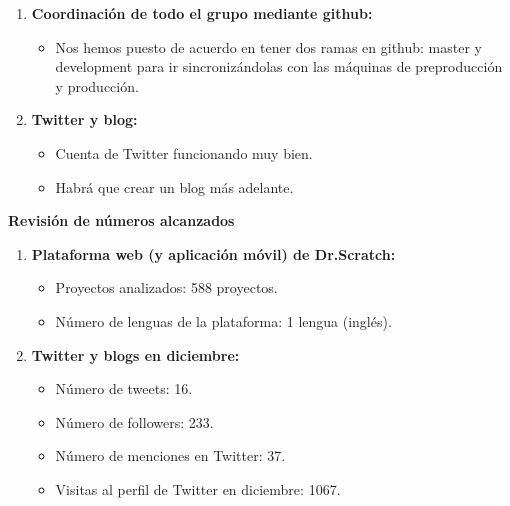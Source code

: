\documentclass[a4paper,12pt]{letter}
\begin{document}
\begin{letter}
\begin{enumerate}
    \vspace{0.5cm}
	\item {\textbf {Coordinación de todo el grupo mediante github:}}
    \begin{itemize}
        \item {Nos hemos puesto de acuerdo en tener dos ramas en github: master
                y development para ir sincronizándolas con las máquinas de 
                preproducción y producción.}
    \end{itemize}

    \item {\textbf {Twitter y blog:}}
        \begin{itemize}
            \item {Cuenta de Twitter funcionando muy bien.}
            \item {Habrá que crear un blog más adelante.}
        \end{itemize}
\end{enumerate}


\vspace{1cm} 
\textbf{\LARGE Revisión de números alcanzados}

\setlength{\parskip}{4mm}
\begin{enumerate}
    \item {\textbf{Plataforma web (y aplicación móvil) de Dr.Scratch:}}
	
    \setlength{\parskip}{2mm}
    \begin{itemize}
      	\setlength{\parskip}{0mm}        
      
	    \item {Proyectos analizados: 588 proyectos.}
	    \item {Número de lenguas de la plataforma: 1 lengua (inglés).}
    \end{itemize}

    \item {\textbf{Twitter y blogs en diciembre:}}

    \setlength{\parskip}{2mm}
    \begin{itemize}
      	\setlength{\parskip}{0mm}        
       	\item {Número de tweets: 16.}  
	    \item {Número de followers: 233.}
	    \item {Número de menciones en Twitter: 37.}
        \item {Visitas al perfil de Twitter en diciembre: 1067.}
    \end{itemize}

\end{enumerate}

\end{letter}
\end{document}

